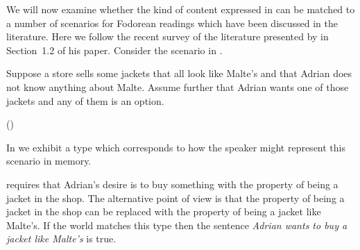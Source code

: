 We will now examine whether the kind of content expressed in  can be
matched to a number of scenarios for Fodorean readings which have been
discussed in the literature.  Here we follow the recent survey of the
literature presented by \cite{Prossms} in Section~1.2 of his paper.
Consider the scenario in \nexteg{}.
\begin{ex} 
Suppose a store sells some jackets that all look like Malte's and that
Adrian does not know anything about Malte. Assume further that Adrian
wants one of those jackets and any of them is an option. 

\hfill (\cite{RomoliSudo2009})
\end{ex} 
In \nexteg{} we exhibit a type which corresponds to how the speaker
might represent this scenario in memory.
\begin{ex} 
\end{ex} 
\preveg{} requires that Adrian's desire is to buy something with the
property of being a jacket in the shop.  The alternative point of view
is that the property of being a jacket in the shop can be replaced
with the property of being a jacket like Malte's.  If the world
matches this type then the sentence \textit{Adrian wants to buy a
  jacket like Malte's} is true.  

